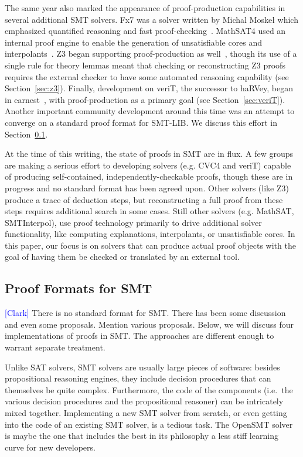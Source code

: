 \documentclass{llncs}
\newcommand{\Note}[1]{\textcolor{blue}{[#1]}}
\begin{document}
The same year also marked the appearance of proof-production capabilities in
several additional SMT solvers.  Fx7 was a solver written by Michal Moske\l
which emphasized quantified reasoning and fast proof-checking~\cite{M08}.
MathSAT4 used an internal proof engine to enable the generation of
unsatisfiable cores and interpolants~\cite{BCF+08}.  Z3 began supporting
proof-production as well~\cite{dMB08}, though its use of a single rule for
theory lemmas meant that checking or reconstructing Z3 proofs requires the
external checker to have some automated reasoning capability (see
Section~\ref{sec:z3}).  Finally, development on veriT, the successor to haRVey,
began in earnest~\cite{BdOD+09}, with proof-production as a primary goal (see Section~\ref{sec:veriT}).
Another important community development around this time was an attempt to
converge on a standard proof format for SMT-LIB.  We discuss this effort in
Section~\ref{sec:format}.

At the time of this writing, the state of proofs in SMT are in flux.  A few
groups are making a serious effort to developing solvers (e.g. CVC4 and veriT)
capable of producing self-contained, independently-checkable proofs, though
these are in progress and no standard format has been agreed upon.  Other
solvers (like Z3) produce a trace of deduction steps, but reconstructing a full
proof from these steps requires additional search in some cases.  Still other
solvers (e.g. MathSAT, SMTInterpol), use proof technology primarily to drive
additional solver functionality, like computing explanations, interpolants, or
unsatisfiable cores.  In this paper, our focus is on solvers that can produce
actual proof objects with the goal of having them be checked or translated by
an external tool.

\subsection{Proof Formats for SMT}
\label{sec:format}

\Note{Clark}
There is no standard format for SMT.  There has been some discussion and even
some proposals.  Mention various proposals.  Below, we will discuss four
implementations of proofs in SMT.  The approaches are different enough to
warrant separate treatment.

Unlike SAT solvers, SMT solvers are usually large pieces of software: besides
propositional reasoning engines, they include decision procedures that can
themselves be quite complex.  Furthermore, the code of the components (i.e.\ the
various decision procedures and the propositional reasoner) can be intricately
mixed together.  Implementing a new SMT solver from scratch, or even getting
into the code of an existing SMT solver, is a tedious task.  The OpenSMT
solver~\cite{} is maybe the one that includes the best in its philosophy a less
stiff learning curve for new developers.
\end{document}
